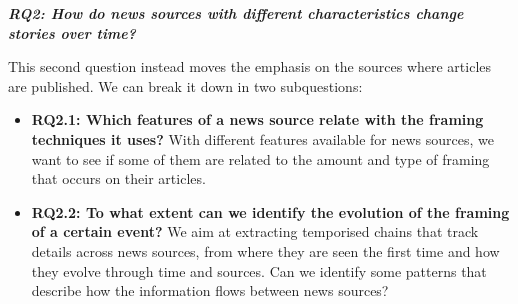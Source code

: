 \vspace{12px}

\textit{\textbf{RQ2: How do news sources with different characteristics change stories over time?}}

\vspace{12px}

This second question instead moves the emphasis on the sources where articles are published. We can break it down in two subquestions:

\begin{itemize}
    \item \textbf{RQ2.1: Which features of a news source relate with the framing techniques it uses?}
    With different features available for news sources, we want to see if some of them are related to the amount and type of framing that occurs on their articles.
    
    \item \textbf{RQ2.2: To what extent can we identify the evolution of the framing of a certain event?}
    We aim at extracting temporised chains that track details across news sources, from where they are seen the first time and how they evolve through time and sources.
    Can we identify some patterns that describe how the information flows between news sources?
    
    
    
\end{itemize}
